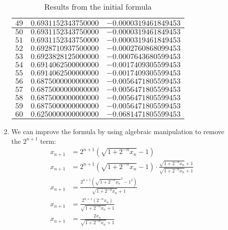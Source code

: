 \documentclass{article}
\begin{document}
\begin{enumerate}
\begin{enumerate}
\begin{table}[H]
\begin{tabular}{ |c|c|c| }
 \hline
$49$ & $0.6931152343750000$ & $-0.0000319461849453$ \\
 \hline
$50$ & $0.6931152343750000$ & $-0.0000319461849453$ \\
 \hline
$51$ & $0.6931152343750000$ & $-0.0000319461849453$ \\
 \hline
$52$ & $0.6928710937500000$ & $-0.0002760868099453$ \\
 \hline
$53$ & $0.6923828125000000$ & $-0.0007643680599453$ \\
 \hline
$54$ & $0.6914062500000000$ & $-0.0017409305599453$ \\
 \hline
$55$ & $0.6914062500000000$ & $-0.0017409305599453$ \\
 \hline
$56$ & $0.6875000000000000$ & $-0.0056471805599453$ \\
 \hline
$57$ & $0.6875000000000000$ & $-0.0056471805599453$ \\
 \hline
$58$ & $0.6875000000000000$ & $-0.0056471805599453$ \\
 \hline
$59$ & $0.6875000000000000$ & $-0.0056471805599453$ \\
 \hline
$60$ & $0.6250000000000000$ & $-0.0681471805599453$ \\
 \hline
\end{tabular}
\caption{Results from the initial formula}
\label{table:1}
\end{table}

  \item We can improve the formula by using algebraic manipulation to remove the $2^{n+1}$ term:
\begin{align*}
x_{n+1} &= 2^{n+1} ( \sqrt{1+2^{-n} x_n} - 1) \\
x_{n+1} &= 2^{n+1} ( \sqrt{1+2^{-n} x_n} - 1) \cdot \frac{\sqrt{1+2^{-n} x_n} + 1}{\sqrt{1+2^{-n} x_n} + 1} \\
x_{n+1} &= \frac{2^{n+1} ( \sqrt{1+2^{-n} x_n}^2 - 1^2) }{\sqrt{1+2^{-n} x_n} + 1} \\
x_{n+1} &= \frac{2^{n+1} (2^{-n} x_n) }{\sqrt{1+2^{-n} x_n} + 1} \\
x_{n+1} &= \frac{2 x_n}{\sqrt{1+2^{-n} x_n} + 1}
\end{align*}


\end{enumerate}
\end{enumerate}
\end{document}
